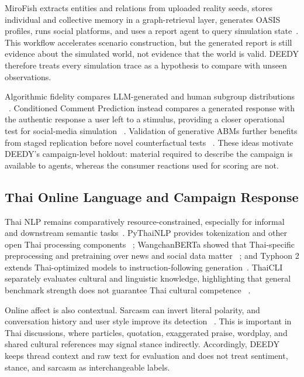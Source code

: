 \documentclass[conference]{IEEEtran}
\begin{document}
MiroFish extracts entities and relations from uploaded reality seeds, stores
individual and collective memory in a graph-retrieval layer, generates OASIS
profiles, runs social platforms, and uses a report agent to query simulation
state~\cite{mirofish2026}. This workflow accelerates scenario construction, but
the generated report is still evidence about the simulated world, not evidence
that the world is valid. DEEDY therefore treats every simulation trace as a
hypothesis to compare with unseen observations.

Algorithmic fidelity compares LLM-generated and human subgroup distributions
~\cite{argyle2023out}. Conditioned Comment Prediction instead compares a
generated response with the authentic response a user left to a stimulus,
providing a closer operational test for social-media simulation
~\cite{schwager2026conditioned}. Validation of generative ABMs further benefits
from staged replication before novel counterfactual tests
~\cite{cross2025validating}. These ideas motivate DEEDY's campaign-level
holdout: material required to describe the campaign is available to agents,
whereas the consumer reactions used for scoring are not.

\subsection{Thai Online Language and Campaign Response}

Thai NLP remains comparatively resource-constrained, especially for informal
and downstream semantic tasks~\cite{arreerard2022survey}. PyThaiNLP provides
tokenization and other open Thai processing components
~\cite{phatthiyaphaibun2023pythainlp}; WangchanBERTa showed that Thai-specific
preprocessing and pretraining over news and social data matter
~\cite{lowphansirikul2021wangchanberta}; and Typhoon 2 extends Thai-optimized
models to instruction-following generation~\cite{pipatanakul2024typhoon2}.
ThaiCLI separately evaluates cultural and linguistic knowledge, highlighting
that general benchmark strength does not guarantee Thai cultural competence
~\cite{kim2025thaicli}.

Online affect is also contextual. Sarcasm can invert literal polarity, and
conversation history and user style improve its detection
~\cite{hazarika2018cascade}. This is important in Thai discussions, where
particles, quotation, exaggerated praise, wordplay, and shared cultural
references may signal stance indirectly. Accordingly, DEEDY keeps thread
context and raw text for evaluation and does not treat sentiment, stance, and
sarcasm as interchangeable labels.
\end{document}
